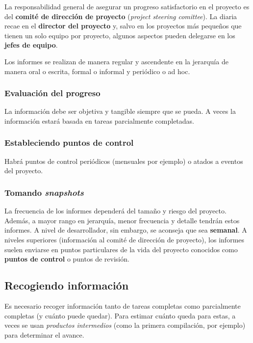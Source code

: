 \documentclass[12pt]{article}
\begin{document}
{La responsabilidad general de asegurar un progreso satisfactorio en el proyecto es del \textbf{comité de dirección de proyecto} (\textit{project steering comittee}). La diaria recae en el \textbf{director del proyecto} y, salvo en los proyectos más pequeños que tienen un solo equipo por proyecto, algunos aspectos pueden delegarse en los \textbf{jefes de equipo}.} \bigskip

{Los informes se realizan de manera regular y ascendente en la jerarquía de manera oral o escrita, formal o informal y periódico o ad hoc.}

\subsubsection{Evaluación del progreso}
\label{9.2.2}

{La información debe ser objetiva y tangible siempre que se pueda. A veces la información estará basada en tareas parcialmente completadas.}

\subsubsection{Estableciendo puntos de control}
\label{9.2.3}

{Habrá puntos de control periódicos (mensuales por ejemplo) o atados a eventos del proyecto.}

\subsubsection{Tomando \textit{snapshots}}
\label{9.2.4}

{La frecuencia de los informes dependerá del tamaño y riesgo del proyecto. Además, a mayor rango en jerarquía, menor frecuencia y detalle tendrán estos informes. A nivel de desarrollador, sin embargo, se aconseja que sea \textbf{semanal}. A niveles superiores (información al comité de dirección de proyecto), los informes suelen enviarse en puntos particulares de la vida del proyecto conocidos como \textbf{puntos de control} o puntos de revisión.}

\subsection{Recogiendo información}
\label{9.3.0}

{Es necesario recoger información tanto de tareas completas como parcialmente completas (y cuánto puede quedar). Para estimar cuánto queda para estas, a veces se usan \textit{productos intermedios} (como la primera compilación, por ejemplo) para determinar el avance.}
\end{document}
